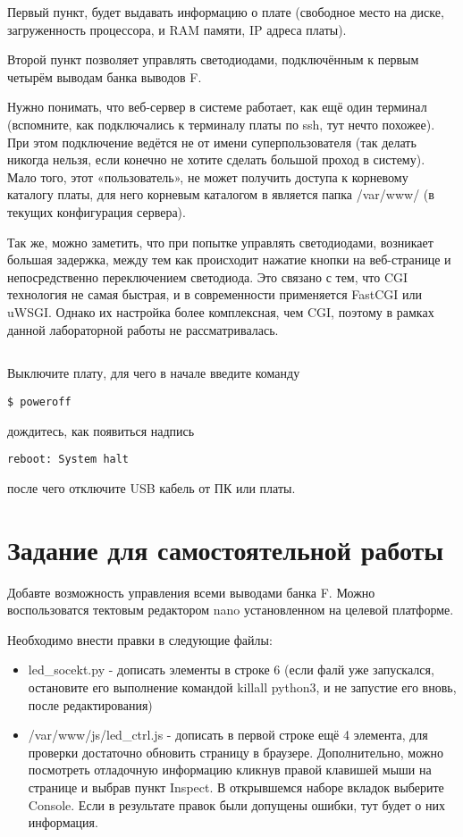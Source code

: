 Первый пункт, будет выдавать информацию о плате (свободное место на диске, загруженность процессора, и RAM памяти, IP адреса платы).

Второй пункт позволяет управлять светодиодами, подключённым к первым четырём выводам банка выводов F.

Нужно понимать, что веб-сервер в системе работает, как ещё один терминал (вспомните, как подключались к терминалу платы по ssh, тут нечто похожее). При этом подключение ведётся не от имени суперпользователя (так делать никогда нельзя, если конечно не хотите сделать большой проход в систему). Мало того, этот «пользователь», не может получить доступа к корневому каталогу платы, для него корневым каталогом в является папка /var/www/ (в текущих конфигурация сервера).

Так же, можно заметить, что при попытке управлять светодиодами, возникает большая задержка, между тем как происходит нажатие кнопки на веб-странице и непосредственно переключением светодиода. Это связано с тем, что CGI технология не самая быстрая, и в современности применяется FastCGI или uWSGI. Однако их настройка более комплексная, чем CGI, поэтому в рамках данной лабораторной работы не рассматривалась.   

\subsection{} Выключите плату, для чего в начале введите команду
\begin{lstlisting}[style=bash]
	$ poweroff
\end{lstlisting}
дождитесь, как появиться надпись
\begin{lstlisting}[style=stdout]
	reboot: System halt
\end{lstlisting}
после чего отключите USB кабель от ПК или платы. 

\section{Задание для самостоятельной работы}
Добавте возможность управления всеми выводами банка F. Можно воспользоватся тектовым редактором nano установленном на целевой платформе.

Необходимо внести правки в следующие файлы:
\begin{itemize}
	\item led\_socekt.py - дописать элементы в строке 6 (если фалй уже запускался, остановите его выполнение командой killall python3, и не запустие его вновь, после редактирования)
	
	\item /var/www/js/led\_ctrl.js - дописать в первой строке ещё 4 элемента, для проверки достаточно обновить страницу в браузере. Дополнительно, можно посмотреть отладочную информацию кликнув правой клавишей мыши на странице и выбрав пункт Inspect. В открывшемся наборе вкладок выберите Console. Если в результате правок были допущены ошибки, тут будет о них информация. 
	
	
\end{itemize} 